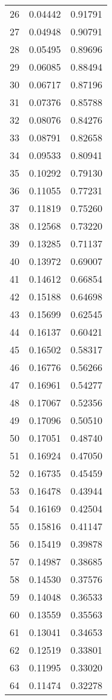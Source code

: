 \documentclass{elsarticle}
\begin{document}
\begin{center}
\begin{longtable}{|c|cc|}
  26 & 0.04442 & 0.91791 \\
  27 & 0.04948 & 0.90791 \\
  28 & 0.05495 & 0.89696 \\
  29 & 0.06085 & 0.88494 \\
  30 & 0.06717 & 0.87196 \\
  31 & 0.07376 & 0.85788 \\
  32 & 0.08076 & 0.84276 \\
  33 & 0.08791 & 0.82658 \\
  34 & 0.09533 & 0.80941 \\
  35 & 0.10292 & 0.79130 \\
  36 & 0.11055 & 0.77231 \\
  37 & 0.11819 & 0.75260 \\
  38 & 0.12568 & 0.73220 \\
  39 & 0.13285 & 0.71137 \\
  40 & 0.13972 & 0.69007 \\
  41 & 0.14612 & 0.66854 \\
  42 & 0.15188 & 0.64698 \\
  43 & 0.15699 & 0.62545 \\
  44 & 0.16137 & 0.60421 \\
  45 & 0.16502 & 0.58317 \\
  46 & 0.16776 & 0.56266 \\
  47 & 0.16961 & 0.54277 \\
  48 & 0.17067 & 0.52356 \\
  49 & 0.17096 & 0.50510 \\
  50 & 0.17051 & 0.48740 \\
  51 & 0.16924 & 0.47050 \\
  52 & 0.16735 & 0.45459 \\
  53 & 0.16478 & 0.43944 \\
  54 & 0.16169 & 0.42504 \\
  55 & 0.15816 & 0.41147 \\
  56 & 0.15419 & 0.39878 \\
  57 & 0.14987 & 0.38685 \\
  58 & 0.14530 & 0.37576 \\
  59 & 0.14048 & 0.36533 \\
  60 & 0.13559 & 0.35563 \\
  61 & 0.13041 & 0.34653 \\
  62 & 0.12519 & 0.33801 \\
  63 & 0.11995 & 0.33020 \\
  64 & 0.11474 & 0.32278 \\

\end{longtable}
\end{center}
\end{document}
